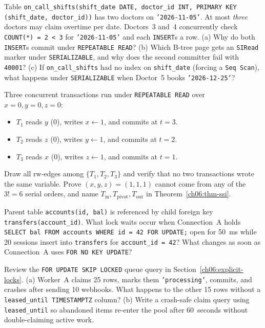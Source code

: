 \begin{exercise}
Table \texttt{on\_call\_shifts(shift\_date DATE, doctor\_id INT, PRIMARY KEY (shift\_date, doctor\_id))} has two doctors on \texttt{'2026-11-05'}. At most \emph{three} doctors may claim overtime per date. Doctors~3 and~4 concurrently check \texttt{COUNT(*) = 2 < 3} for \texttt{'2026-11-05'} and each \texttt{INSERT}s a row.
(a) Why do both \texttt{INSERT}s commit under \texttt{REPEATABLE READ}?
(b) Which B-tree page gets an \texttt{SIRead} marker under \texttt{SERIALIZABLE}, and why does the second committer fail with \texttt{40001}?
(c) If \texttt{on\_call\_shifts} had no index on \texttt{shift\_date} (forcing a \texttt{Seq Scan}), what happens under \texttt{SERIALIZABLE} when Doctor~5 books \texttt{'2026-12-25'}?
\end{exercise}

\begin{exercise}
Three concurrent transactions run under \texttt{REPEATABLE READ} over $x=0, y=0, z=0$:
\begin{itemize}
  \item $T_1$ reads $y$ ($0$), writes $x \gets 1$, and commits at $t=3$.
  \item $T_2$ reads $z$ ($0$), writes $y \gets 1$, and commits at $t=2$.
  \item $T_3$ reads $x$ ($0$), writes $z \gets 1$, and commits at $t=1$.
\end{itemize}
Draw all $\mathrm{rw}$-edges among $\{T_1, T_2, T_3\}$ and verify that no two transactions wrote the same variable. Prove $(x,y,z) = (1,1,1)$ cannot come from any of the $3! = 6$ serial orders, and name $T_{\mathrm{in}}, T_{\mathrm{pivot}}, T_{\mathrm{out}}$ in Theorem~\ref{ch06:thm-ssi}.
\end{exercise}

\begin{exercise}
Parent table \texttt{accounts(id, bal)} is referenced by child foreign key \texttt{transfers(account\_id)}.
What lock waits occur when Connection~A holds \texttt{SELECT bal FROM accounts WHERE id = 42 FOR UPDATE;} open for 50~ms while 20 sessions insert into \texttt{transfers} for \texttt{account\_id = 42}? What changes as soon as Connection~A uses \texttt{FOR NO KEY UPDATE}?
\end{exercise}

\begin{exercise}
Review the \texttt{FOR UPDATE SKIP LOCKED} queue query in Section~\ref{ch06:explicit-locks}.
(a) Worker~A claims 25 rows, marks them \texttt{'processing'}, commits, and crashes after sending 10 webhooks. What happens to the other 15 rows without a \texttt{leased\_until TIMESTAMPTZ} column?
(b) Write a crash-safe claim query using \texttt{leased\_until} so abandoned items re-enter the pool after 60~seconds without double-claiming active work.
\end{exercise}

